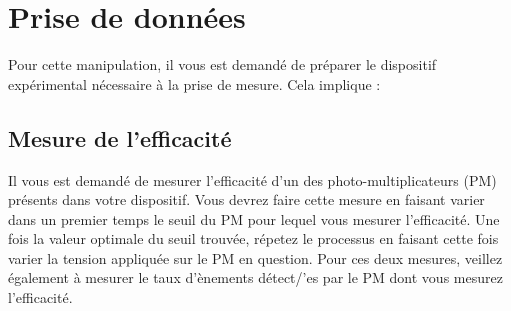 \section{Prise de donn\'ees}

Pour cette manipulation, il vous est demandé de pr\'eparer le dispositif expérimental n\'ecessaire à la prise de mesure. Cela implique :

\begin{center}
\end{center}


\subsection{Mesure de l'efficacit\'e}

Il vous est demandé de mesurer l'efficacit\'e d'un des photo-multiplicateurs (PM) présents dans votre dispositif. Vous devrez faire cette mesure en faisant varier dans un premier temps le seuil du PM pour lequel vous mesurer l'efficacit\'e. Une fois la valeur optimale du seuil trouv\'ee, r\'epetez le processus en faisant cette fois varier la tension appliquée sur le PM en question. Pour ces deux mesures, veillez également à mesurer le taux d'\ev\`enements d\'etect/'es par le PM dont vous mesurez l'efficacit\'e.


